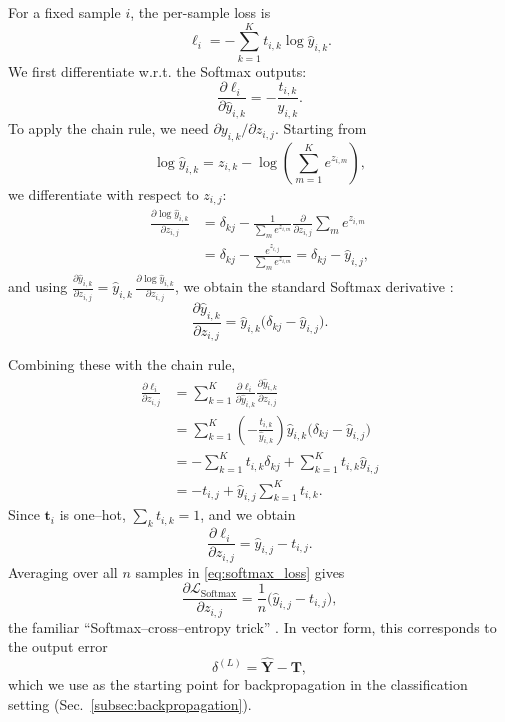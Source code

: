 \documentclass[amssymb,twocolumn,aps]{revtex4}
\begin{document}
For a fixed sample $i$, the per-sample loss is
\[
\ell_i = -\sum_{k=1}^{K} t_{i,k}\log \hat{y}_{i,k}.
\]
We first differentiate w.r.t. the Softmax outputs:
\begin{equation}
\frac{\partial \ell_i}{\partial \hat{y}_{i,k}}
= -\frac{t_{i,k}}{y_{i,k}}.
\end{equation}
To apply the chain rule, we need $\partial y_{i,k}/\partial z_{i,j}$.
Starting from
\[
\log \hat{y}_{i,k}
= z_{i,k} - \log\!\left(\sum_{m=1}^{K} e^{z_{i,m}}\right),
\]
we differentiate with respect to $z_{i,j}$:
\begin{align}
\frac{\partial \log \hat{y}_{i,k}}{\partial z_{i,j}}
&= \delta_{kj}
 - \frac{1}{\sum_{m} e^{z_{i,m}}}
   \frac{\partial}{\partial z_{i,j}}
   \sum_{m} e^{z_{i,m}} \nonumber\\[4pt]
&= \delta_{kj} - \frac{e^{z_{i,j}}}{\sum_{m} e^{z_{i,m}}}
 = \delta_{kj} - \hat{y}_{i,j},
\end{align}
and using
$\frac{\partial \hat{y}_{i,k}}{\partial z_{i,j}}
 = \hat{y}_{i,k}\,\frac{\partial \log \hat{y}_{i,k}}{\partial z_{i,j}}$,
we obtain the standard Softmax derivative
\cite{mehta2023softmax}:
\begin{equation}
\frac{\partial \hat{y}_{i,k}}{\partial z_{i,j}}
= \hat{y}_{i,k}\bigl(\delta_{kj} - \hat{y}_{i,j}\bigr).
\end{equation}

Combining these with the chain rule,
\begin{align}
\frac{\partial \ell_i}{\partial z_{i,j}}
&= \sum_{k=1}^{K}
  \frac{\partial \ell_i}{\partial \hat{y}_{i,k}}
  \frac{\partial \hat{y}_{i,k}}{\partial z_{i,j}} \nonumber\\[4pt]
&= \sum_{k=1}^{K}
  \left(-\frac{t_{i,k}}{\hat{y}_{i,k}}\right)
  \hat{y}_{i,k}\bigl(\delta_{kj} - \hat{y}_{i,j}\bigr) \nonumber\\[4pt]
&= -\sum_{k=1}^{K} t_{i,k}\delta_{kj}
  + \sum_{k=1}^{K} t_{i,k} \hat{y}_{i,j} \nonumber\\[4pt]
&= -t_{i,j} + \hat{y}_{i,j}\sum_{k=1}^{K} t_{i,k}.
\end{align}
Since $\mathbf{t}_i$ is one--hot, $\sum_{k} t_{i,k} = 1$, and we obtain
\begin{equation}
\frac{\partial \ell_i}{\partial z_{i,j}}
= \hat{y}_{i,j} - t_{i,j}.
\end{equation}
Averaging over all $n$ samples in \eqref{eq:softmax_loss} gives
\begin{equation}
\frac{\partial \mathcal{L}_{\mathrm{Softmax}}}{\partial z_{i,j}}
= \frac{1}{n}\bigl(\hat{y}_{i,j} - t_{i,j}\bigr),
\end{equation}
the familiar ``Softmax--cross--entropy trick''
\cite{mehta2023softmax,goodfellow2016}.
In vector form, this corresponds to the output error
\begin{equation}
\delta^{(L)} = \hat{\mathbf{Y}} - \mathbf{T},
\end{equation}
which we use as the starting point for backpropagation in the
classification setting (Sec.~\ref{subsec:backpropagation}).
\end{document}
